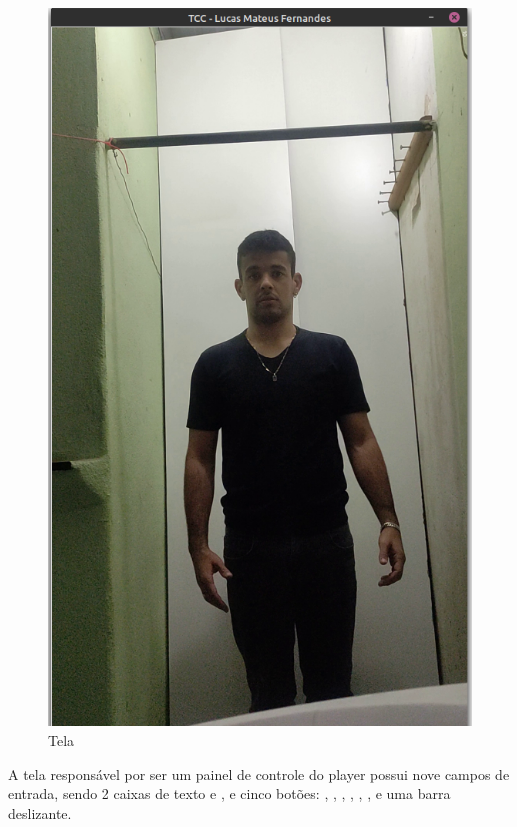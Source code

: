 \begin{figure}[H]
	\centering
	\caption{Tela }
	\includegraphics[scale=0.25]{figuras/view/player.png}
\end{figure}


A tela responsável por ser um painel de controle do player possui nove campos de entrada, sendo 2 caixas de texto  e , e cinco botões: , , , , , , e uma barra deslizante.

